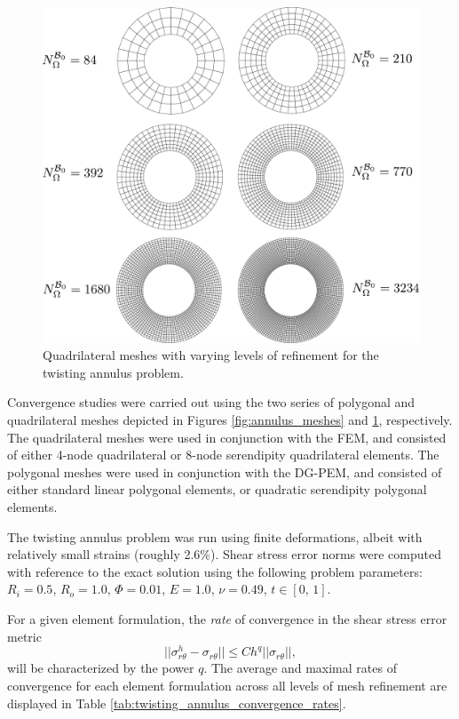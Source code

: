 \begin{figure}[!h]
  \centering
  \includegraphics[width=6.0in]{figures/quad_annulus_meshes.pdf}
  \caption{Quadrilateral meshes with varying levels of refinement for the twisting annulus problem.}
  \label{fig:quad_annulus_meshes}
\end{figure}

Convergence studies were carried out using the two series of polygonal and quadrilateral meshes depicted in Figures \ref{fig:annulus_meshes} and \ref{fig:quad_annulus_meshes}, respectively. The quadrilateral meshes were used in conjunction with the FEM, and consisted of either 4-node quadrilateral or 8-node serendipity quadrilateral elements. The polygonal meshes were used in conjunction with the DG-PEM, and consisted of either standard linear polygonal elements, or quadratic serendipity polygonal elements.

The twisting annulus problem was run using finite deformations, albeit with relatively small strains (roughly 2.6\%). Shear stress error norms were computed with reference to the exact solution using the following problem parameters: $R_i = 0.5$, $R_o = 1.0$, $\Phi = 0.01$, $E = 1.0$, $\nu = 0.49$, $t \in [0, \, 1]$. 

For a given element formulation, the \textit{rate} of convergence in the shear stress error metric
\begin{equation}
	||\sigma_{r \theta}^h - \sigma_{r \theta}|| \leq C h^q ||\sigma_{r \theta}||,
\end{equation}
will be characterized by the power $q$. The average and maximal rates of convergence for each element formulation across all levels of mesh refinement are displayed in Table \ref{tab:twisting_annulus_convergence_rates}.

